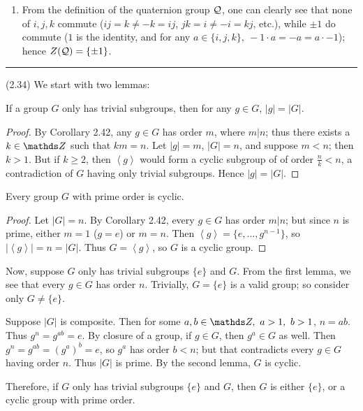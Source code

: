 \documentclass{homework}
\begin{document}
\begin{solution}
\begin{enumerate}[label=(\alph*)]
\begin{proof}[Proof]
        By definition, $e$ commutes with every element in $ \D_n$. Therefore, $Z(\D_n)=\{ e \}$ when
        $n$ is odd, and $Z(\D_n)=\{ e,r_{\frac{n}{2}} \}$ when $n$ is even.
      \end{proof}
      
    \item From the definition of the quaternion group $\mathcal{Q}$, one can clearly see that none of
      $i,j,k$ commute ($ij=k\neq -k=ij$, $jk=i\neq-i=kj$, etc.), while $\pm 1$ do commute ($1$ is
      the identity, and for any $a\in \{ i,j,k \},\ -1\cdot a=-a=a\cdot -1$); hence $Z(\mathcal{Q})=\{
      \pm 1 \}$.
      
  \end{enumerate}

  \hrule
  \vspace{1ex}
  (2.34) We start with two lemmas:
  \begin{lemma}[]{}
    If a group $G$ only has trivial subgroups, then for any $g\in G$, $\left| g \right| =\left| G
    \right| $.
  \end{lemma}
  \begin{proof}[Proof]
    By Corollary 2.42, any $g\in G$ has order $m$, where $m|n$; thus there exists a $k\in \Z$ such
    that $km=n$. Let $\left| g \right| =m$, $\left| G \right| =n$, and suppose $m<n$; then $k>1$.
    But if $k\ge 2$, then $\left<g \right>$ would form a cyclic subgroup of of order $\frac{n}{k}<n$,
    a contradiction of $G$ having only trivial subgroups. Hence $\left| g \right|=\left| G \right|$.
  \end{proof}
  \begin{lemma}[]{}
    Every group $G$ with prime order is cyclic.
  \end{lemma}
  \begin{proof}[Proof]
    Let $\left| G \right| =n$. By Corollary 2.42, every $g\in G$ has order $m|n$; but since $n$ is
    prime, either $m=1$ ($g=e$) or $m=n$. Then $\left<g \right>=\{ e,\ldots,g^{n-1} \}$, so $\left|
    \left<g \right> \right| =n=\left| G \right| $. Thus $G=\left<g \right>$, so $G$ is a cyclic
    group.
  \end{proof}

  Now, suppose $G$ only has trivial subgroups $\{ e \}$ and $G$. From the first lemma, we see that
  every $g\in G$ has order $n$. Trivially, $G=\{ e \}$ is a valid group; so consider only $G\neq \{
  e\}$.

  Suppose $\left| G \right| $ is composite. Then for some $a,b\in \Z,\ a>1,\ b>1$, $n=ab$. Thus
  $g^{n}=g^{ab}=e$. By closure of a group, if $g\in G$, then $g^{a}\in G$ as well. Then
  $g^{n}=g^{ab}=(g^{a})^{b}=e$, so $g^{a}$ has order $b<n$; but that contradicts every $g\in G$
  having order $n$. Thus $\left| G \right| $ is prime. By the second lemma, $G$ is cyclic.

  Therefore, if $G$ only has trivial subgroups $\{ e \}$ and $G$, then $G$ is either $\{ e \}$, or a
  cyclic group with prime order.
\end{solution}
\end{document}
